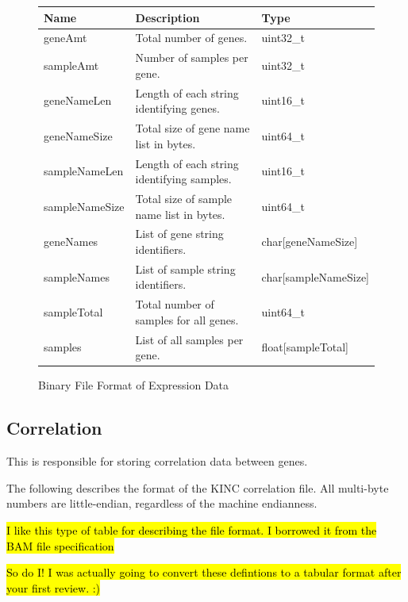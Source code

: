 \documentclass[10pt]{article}
\providecommand{\stephen}[1]{\sethlcolor{lyellow}\hl{#1}}
\providecommand{\josh}[1]{\sethlcolor{lblue}\hl{#1}}
\begin{document}
\begin{figure}[H]
\begin{mdframed}[style=btable]
\begin{tabularx}{\textwidth}{|l|X|l|}
\hline
\textbf{Name} & \textbf{Description} & \textbf{Type} \\
\hline
geneAmt & Total number of genes. & uint32\_t \\
\hline
sampleAmt & Number of samples per gene. & uint32\_t \\
\hline
geneNameLen & Length of each string identifying genes. & uint16\_t \\
\hline
geneNameSize & Total size of gene name list in bytes. & uint64\_t \\
\hline
sampleNameLen & Length of each string identifying samples. & uint16\_t \\
\hline
sampleNameSize & Total size of sample name list in bytes. & uint64\_t \\
\hline
geneNames & List of gene string identifiers. & char[geneNameSize] \\
\hline
sampleNames & List of sample string identifiers. & char[sampleNameSize] \\
\hline
sampleTotal & Total number of samples for all genes. & uint64\_t \\
\hline
samples & List of all samples per gene. & float[sampleTotal] \\
\hline
\end{tabularx}
\end{mdframed}
\caption{Binary File Format of Expression Data}
\label{fig:expression}
\end{figure}

\subsection{Correlation}

This is responsible for storing correlation data between genes.

The following describes the format of the KINC correlation file. All 
multi-byte numbers are little-endian, regardless of the machine endianness.

\stephen{I like this type of table for describing the file format. I borrowed 
it from the BAM file specification}

\josh{So do I! I was actually going to convert these defintions to a tabular 
format after your first review. :)}
\end{document}
